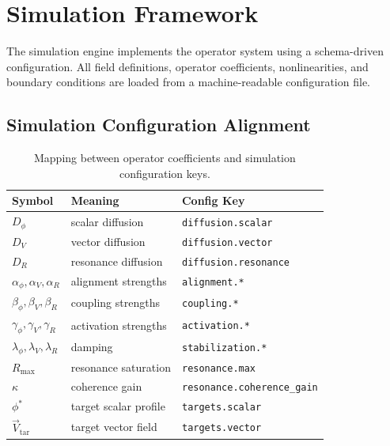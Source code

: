 \documentclass[12pt]{article}
\begin{document}
\section{Simulation Framework}

The simulation engine implements the operator system using a schema-driven configuration. All field definitions, operator coefficients, nonlinearities, and boundary conditions are loaded from a machine-readable configuration file.

\subsection{Simulation Configuration Alignment}

\begin{table}[h]
\centering
\begin{tabular}{lll}
\hline
Symbol & Meaning & Config Key \\
\hline
$D_\phi$ & scalar diffusion & \texttt{diffusion.scalar} \\
$D_V$ & vector diffusion & \texttt{diffusion.vector} \\
$D_R$ & resonance diffusion & \texttt{diffusion.resonance} \\
$\alpha_\phi, \alpha_V, \alpha_R$ & alignment strengths & \texttt{alignment.*} \\
$\beta_\phi, \beta_V, \beta_R$ & coupling strengths & \texttt{coupling.*} \\
$\gamma_\phi, \gamma_V, \gamma_R$ & activation strengths & \texttt{activation.*} \\
$\lambda_\phi, \lambda_V, \lambda_R$ & damping & \texttt{stabilization.*} \\
$R_{\max}$ & resonance saturation & \texttt{resonance.max} \\
$\kappa$ & coherence gain & \texttt{resonance.coherence\_gain} \\
$\phi^\ast$ & target scalar profile & \texttt{targets.scalar} \\
$\vec{V}_{\mathrm{tar}}$ & target vector field & \texttt{targets.vector} \\
\hline
\end{tabular}
\caption{Mapping between operator coefficients and simulation configuration keys.}
\label{tab:config-map}
\end{table}
\end{document}
